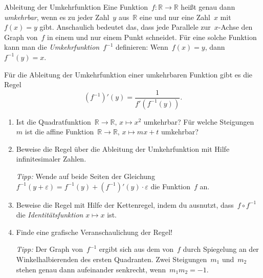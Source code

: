\documentclass[twoside]{../zirkelblatt}
\newcommand{\RR}{\mathbb{R}}
\theoremstyle{definition}
\theoremstyle{plain}
\theoremstyle{remark}
\begin{document}
\begin{aufgabeShaded}{Ableitung der Umkehrfunktion}
Eine Funktion~$f : \RR \to \RR$ heißt genau dann \emph{umkehrbar}, wenn es zu
jeder Zahl~$y$ aus~$\RR$ eine und nur eine Zahl~$x$ mit~$f(x) = y$ gibt.
Anschaulich bedeutet das, dass jede Parallele zur~$x$-Achse den Graph von~$f$
in einem und nur einem Punkt schneidet. Für eine solche Funktion kann man die
\emph{Umkehrfunktion}~$f^{-1}$ definieren: Wenn~$f(x) = y$, dann~$f^{-1}(y) =
x$.

Für die Ableitung der Umkehrfunktion einer umkehrbaren Funktion gibt es
die Regel
\[ (f^{-1})'(y) = \frac{1}{f'(f^{-1}(y))}. \]
\begin{enumerate}
\item Ist die Quadratfunktion~$\RR \to \RR,\,x \mapsto x^2$ umkehrbar?
Für welche Steigungen~$m$ ist die affine Funktion~$\RR \to \RR,\,x \mapsto mx+t$
umkehrbar?

\item Beweise die Regel über die Ableitung der Umkehrfunktion mit Hilfe
infinitesimaler Zahlen.

\emph{Tipp:} Wende auf beide Seiten der Gleichung~$f^{-1}(y+\varepsilon) =
f^{-1}(y) + (f^{-1})'(y) \cdot \varepsilon$ die Funktion~$f$ an.

\item Beweise die Regel mit Hilfe der Kettenregel, indem du ausnutzt, dass~$f
\circ f^{-1}$ die \emph{Identitätsfunktion} $x \mapsto x$ ist.

\item Finde eine grafische Veranschaulichung der Regel!

\emph{Tipp:} Der Graph von~$f^{-1}$ ergibt sich aus dem von~$f$ durch
Spiegelung an der Winkelhalbierenden des ersten Quadranten. Zwei
Steigungen~$m_1$ und~$m_2$ stehen genau dann aufeinander senkrecht, wenn~$m_1
m_2 = -1$.
\end{enumerate}
\end{aufgabeShaded}
\end{document}
